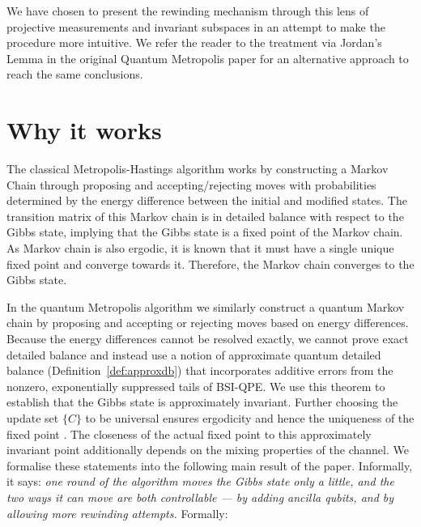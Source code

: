 We have chosen to present the rewinding mechanism through this lens of projective measurements and invariant subspaces in an attempt to make the procedure more intuitive. We refer the reader to the treatment via Jordan's Lemma in the original Quantum Metropolis paper \cite{Temme_2011} for an alternative approach to reach the same conclusions.
\label{section:rejection}

\section{Why it works}
\label{section:why}
The classical Metropolis-Hastings algorithm works by constructing a Markov Chain through proposing and accepting/rejecting moves with probabilities determined by the energy difference between the initial and modified states. The transition matrix of this Markov chain is in detailed balance with respect to the Gibbs state, implying that the Gibbs state is a fixed point of the Markov chain. As Markov chain is also ergodic, it is known that it must have a single unique fixed point and converge towards it. Therefore, the Markov chain converges to the Gibbs state.

In the quantum Metropolis algorithm we similarly construct a quantum Markov chain by proposing and accepting or rejecting moves based on energy differences. Because the energy differences cannot be resolved exactly, we cannot prove exact detailed balance and instead use a notion of approximate quantum detailed balance (Definition~\ref{def:approxdb}) that incorporates additive errors from the nonzero, exponentially suppressed tails of BSI-QPE. We use this theorem to establish that the Gibbs state is approximately invariant. Further choosing the update set $\{C\}$ to be universal ensures ergodicity and hence the uniqueness of the fixed point \cite{Temme_2011}. The closeness of the actual fixed point to this approximately invariant point additionally depends on the mixing properties of the channel. We formalise these statements into the following main result of the paper. Informally, it says: \emph{one round of the algorithm moves the Gibbs state only a little, and the two ways it can move are both controllable --- by adding ancilla qubits, and by allowing more rewinding attempts.} Formally:


